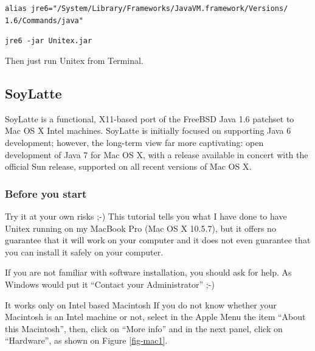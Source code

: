 \bigskip
\noindent \verb+alias jre6="/System/Library/Frameworks/JavaVM.framework/Versions/+
\noindent \verb+1.6/Commands/java"+
   
\bigskip
\noindent \verb+jre6 -jar Unitex.jar+

\bigskip
\noindent Then just run Unitex from Terminal.

\subsection{SoyLatte}
\bigskip{}
\noindent SoyLatte is a functional, X11-based port of the FreeBSD
Java 1.6 patchset to Mac OS X Intel machines. SoyLatte is initially focused on 
supporting Java 6 development; however, the long-term view far more captivating: 
open development of Java 7 for Mac OS X, with a release available in concert 
with the official Sun release, supported on all recent versions of Mac OS X.

\subsubsection{Before you start}
\noindent Try it at your own risks ;-) This tutorial tells you what I have done
to have Unitex running on my MacBook Pro (Mac OS X 10.5.7), but it offers no guarantee 
that it will work  on your computer and it does not even guarantee that you can 
install it safely on your computer.

\bigskip
\noindent If you are not familiar with software installation, you should ask for
help. As Windows would put it ``Contact your Administrator'' ;-) 

\bigskip
\noindent It works only on Intel based Macintosh If you do not know whether your 
Macintosh is an Intel machine or not, select in the Apple Menu the item 
``About this Macintosh'', then, click on ``More info'' and in the next panel,
click on ``Hardware'', as shown on Figure \ref{fig-mac1}.

